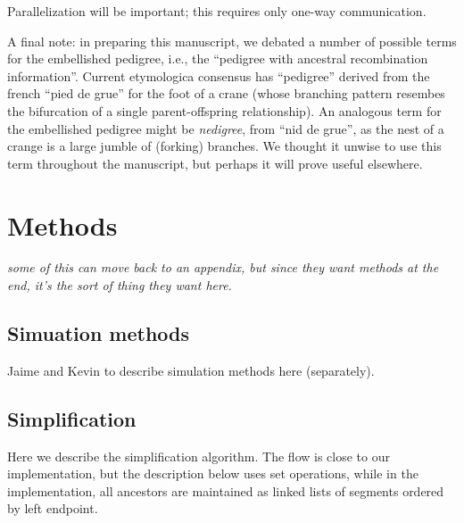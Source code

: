 \documentclass{article}
\newcommand{\plr}[1]{{\em \color{blue} #1}}
\begin{document}
Parallelization will be important;
this requires only one-way communication.

A final note:
in preparing this manuscript, 
we debated a number of possible terms for the embellished pedigree,
i.e., the ``pedigree with ancestral recombination information''.
Current etymologica consensus \citep{liberman2014little} has
``pedigree'' derived from the french ``pied de grue'' for the foot of a crane
(whose branching pattern resembes the bifurcation of a single parent-offspring relationship).
An analogous term for the embellished pedigree might be \emph{nedigree},
from ``nid de grue'',
as the nest of a crange is a large jumble of (forking) branches.
We thought it unwise to use this term throughout the manuscript,
but perhaps it will prove useful elsewhere.


\section*{Methods}

\plr{some of this can move back to an appendix, but since they want methods at the end,
it's the sort of thing they want here.}

\subsection*{Simuation methods}

Jaime and Kevin to describe simulation methods here (separately).


\subsection*{Simplification}

Here we describe the simplification algorithm.
The flow is close to our implementation,
but the description below uses set operations,
while in the implementation,
all ancestors are maintained as linked lists of segments
ordered by left endpoint.
\end{document}
